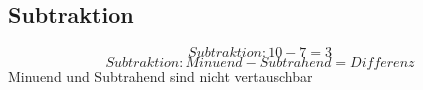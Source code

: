 \subsection{Subtraktion}

$$Subtraktion: 10-7=3$$
$$Subtraktion: Minuend-Subtrahend=Differenz$$
Minuend und Subtrahend sind nicht vertauschbar